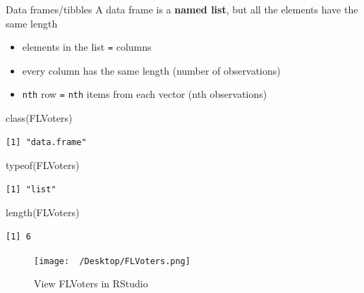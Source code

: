 \documentclass[
  ignorenonframetext,
]{beamer}
\newenvironment{Shaded}{\begin{snugshade}}{\end{snugshade}}
\newcommand{\FunctionTok}[1]{\textcolor[rgb]{0.28,0.35,0.67}{#1}}
\newcommand{\NormalTok}[1]{\textcolor[rgb]{0.00,0.23,0.31}{#1}}
\providecommand{\tightlist}{%
  \setlength{\itemsep}{0pt}\setlength{\parskip}{0pt}}\usepackage{longtable,booktabs,array}
\begin{document}
\begin{frame}[fragile]{Data frames/tibbles}
\protect\hypertarget{data-framestibbles-1}{}
A data frame is a \textbf{named list}, but all the elements have the
same length

\begin{itemize}
\tightlist
\item
  elements in the list \texttt{=} columns
\item
  every column has the same length (number of observations)
\item
  \texttt{nth} row \texttt{=} \texttt{nth} items from each vector (nth
  observations)
\end{itemize}

\begin{Shaded}
\begin{Highlighting}[]
\FunctionTok{class}\NormalTok{(FLVoters)}
\end{Highlighting}
\end{Shaded}

\begin{verbatim}
[1] "data.frame"
\end{verbatim}

\begin{Shaded}
\begin{Highlighting}[]
\FunctionTok{typeof}\NormalTok{(FLVoters)}
\end{Highlighting}
\end{Shaded}

\begin{verbatim}
[1] "list"
\end{verbatim}

\begin{Shaded}
\begin{Highlighting}[]
\FunctionTok{length}\NormalTok{(FLVoters)}
\end{Highlighting}
\end{Shaded}

\begin{verbatim}
[1] 6
\end{verbatim}
\end{frame}

\begin{frame}
\begin{figure}

{\centering \texttt{[image: ~/Desktop/FLVoters.png]}

}

\caption{View FLVoters in RStudio}

\end{figure}
\end{frame}
\end{document}
